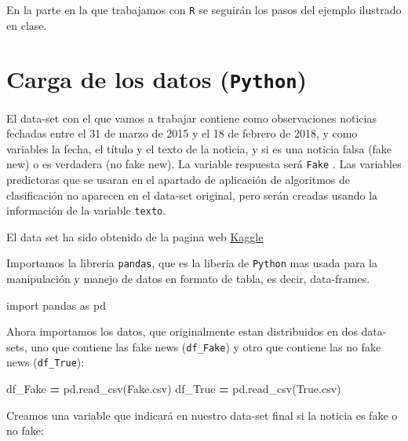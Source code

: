 \documentclass[
  11pt,
  a4paper,
]{article}
\newenvironment{Shaded}{\begin{snugshade}}{\end{snugshade}}
\newcommand{\ImportTok}[1]{#1}
\newcommand{\NormalTok}[1]{#1}
\newcommand{\OperatorTok}[1]{\textcolor[rgb]{0.81,0.36,0.00}{\textbf{#1}}}
\newcommand{\StringTok}[1]{\textcolor[rgb]{0.31,0.60,0.02}{#1}}
\begin{document}
En la parte en la que trabajamos con \texttt{R} se seguirán los pasos
del ejemplo ilustrado en clase.

\hypertarget{carga-de-los-datos-python}{%
\section{\texorpdfstring{Carga de los datos
(\texttt{Python})}{Carga de los datos (Python)}}\label{carga-de-los-datos-python}}

El data-set con el que vamos a trabajar contiene como observaciones
noticias fechadas entre el 31 de marzo de 2015 y el 18 de febrero de
2018, y como variables la fecha, el título y el texto de la noticia, y
si es una noticia falsa (fake new) o es verdadera (no fake new). La
variable respuesta será \texttt{Fake} . Las variables predictoras que se
usaran en el apartado de aplicación de algoritmos de clasificación no
aparecen en el data-set original, pero serán creadas usando la
información de la variable \texttt{texto}.

El data set ha sido obtenido de la pagina web
\href{https://www.kaggle.com/datasets/clmentbisaillon/fake-and-real-news-dataset}{Kaggle}

Importamos la libreria \texttt{pandas}, que es la liberia de
\texttt{Python} mas usada para la manipulación y manejo de datos en
formato de tabla, es decir, data-frames.

\begin{Shaded}
\begin{Highlighting}[]
\ImportTok{import}\NormalTok{ pandas }\ImportTok{as}\NormalTok{ pd}
\end{Highlighting}
\end{Shaded}

Ahora importamos los datos, que originalmente estan distribuidos en dos
data-sets, uno que contiene las fake news (\texttt{df\_Fake}) y otro que
contiene las no fake news (\texttt{df\_True}):

\begin{Shaded}
\begin{Highlighting}[]
\NormalTok{df\_Fake }\OperatorTok{=}\NormalTok{ pd.read\_csv(}\StringTok{\textquotesingle{}Fake.csv\textquotesingle{}}\NormalTok{)}
\NormalTok{df\_True }\OperatorTok{=}\NormalTok{ pd.read\_csv(}\StringTok{\textquotesingle{}True.csv\textquotesingle{}}\NormalTok{)}
\end{Highlighting}
\end{Shaded}

Creamos una variable que indicará en nuestro data-set final si la
noticia es fake o no fake:
\end{document}
